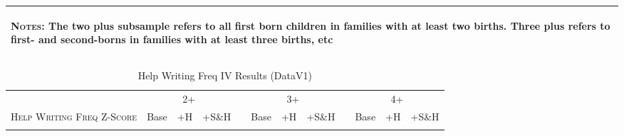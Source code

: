 \begin{landscape}
\begin{table}[htpb!]
\begin{center}
\begin{tabular}{lcccp{2mm}cccp{2mm}ccc}
\midrule\multicolumn{12}{p{19.2cm}}{\begin{footnotesize}\textsc{Notes:} The two plus subsample refers to all first born children in families with at least two births.  Three plus refers to first- and second-borns in families with at least three births, etc\end{footnotesize}} \\ \bottomrule 
\end{tabular}\end{center}\end{table}\end{landscape}\begin{landscape}\begin{table}[htpb!]\caption{Help Writing Freq IV Results (DataV1)}
\label{TWINtab:IVAll}
\begin{center}\begin{tabular}{lcccp{2mm}cccp{2mm}ccc}
\toprule \toprule 
&\multicolumn{3}{c}{2+}&&\multicolumn{3}{c}{3+}&&\multicolumn{3}{c}{4+}\\ \cmidrule(r){2-4} \cmidrule(r){6-8} \cmidrule(r){10-12} 
\textsc{Help Writing Freq Z-Score}&Base&+H&+S\&H&&Base&+H&+S\&H&&Base&+H&+S\&H\\ \midrule 
\begin{footnotesize}\end{footnotesize}& 
\begin{footnotesize}\end{footnotesize}& 
\begin{footnotesize}\end{footnotesize}& 
\begin{footnotesize}\end{footnotesize}& 
\begin{footnotesize}\end{footnotesize}& 
\begin{footnotesize}\end{footnotesize}& 
\begin{footnotesize}\end{footnotesize}& 
\begin{footnotesize}\end{footnotesize}& 
\begin{footnotesize}\end{footnotesize}& 
\begin{footnotesize}\end{footnotesize}& 
\begin{footnotesize}\end{footnotesize}& 
\begin{footnotesize}\end{footnotesize}\\ 

\end{tabular}
\end{center}
\end{table}
\end{landscape}
